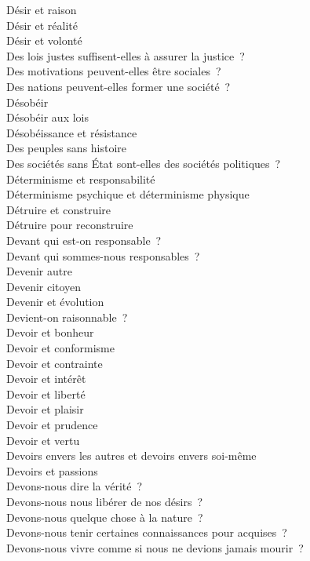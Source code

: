 \documentclass[a4paper,12pt]{article}
\begin{document}
Désir et raison \\
Désir et réalité \\
Désir et volonté \\
Des lois justes suffisent-elles à assurer la justice ? \\
Des motivations peuvent-elles être sociales ? \\
Des nations peuvent-elles former une société ? \\
Désobéir \\
Désobéir aux lois \\
Désobéissance et résistance \\
Des peuples sans histoire \\
Des sociétés sans État sont-elles des sociétés politiques ? \\
Déterminisme et responsabilité \\
Déterminisme psychique et déterminisme physique \\
Détruire et construire \\
Détruire pour reconstruire \\
Devant qui est-on responsable ? \\
Devant qui sommes-nous responsables ? \\
Devenir autre \\
Devenir citoyen \\
Devenir et évolution \\
Devient-on raisonnable ? \\
Devoir et bonheur \\
Devoir et conformisme \\
Devoir et contrainte \\
Devoir et intérêt \\
Devoir et liberté \\
Devoir et plaisir \\
Devoir et prudence \\
Devoir et vertu \\
Devoirs envers les autres et devoirs envers soi-même \\
Devoirs et passions \\
Devons-nous dire la vérité ? \\
Devons-nous nous libérer de nos désirs ? \\
Devons-nous quelque chose à la nature ? \\
Devons-nous tenir certaines connaissances pour acquises ? \\
Devons-nous vivre comme si nous ne devions jamais mourir ? \\
\end{document}
